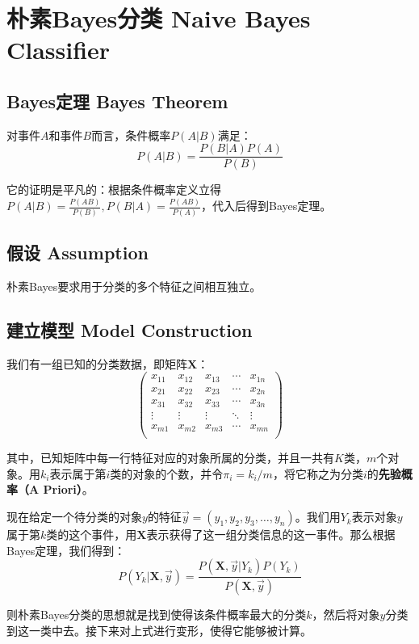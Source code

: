 \documentclass{MGLSA-cn-book-math}
\begin{document}
\section{朴素Bayes分类 Naive Bayes Classifier}
\subsection{Bayes定理 Bayes Theorem}
对事件$A$和事件$B$而言，条件概率$P(A|B)$满足：
\[
	P(A|B)=\frac{P(B|A)P(A)}{P(B)}
\]

它的证明是平凡的：根据条件概率定义立得$P(A|B)=\frac{P(AB)}{P(B)},P(B|A)=\frac{P(AB)}{P(A)}$，代入后得到Bayes定理。
\subsection{假设 Assumption}
朴素Bayes要求用于分类的多个特征之间相互独立。
\subsection{建立模型 Model Construction}
我们有一组已知的分类数据，即矩阵$\bm{X}$：
\[
	\begin{pmatrix}
		x_{11} & x_{12} & x_{13} & \cdots & x_{1n} \\
		x_{21} & x_{22} & x_{23} & \cdots & x_{2n} \\
		x_{31} & x_{32} & x_{33} & \cdots & x_{3n} \\
		\vdots & \vdots & \vdots & \ddots & \vdots \\
		x_{m1} & x_{m2} & x_{m3} & \cdots & x_{mn} \\
	\end{pmatrix}
\]

其中，已知矩阵中每一行特征对应的对象所属的分类，并且一共有$K$类，$m$个对象。用$k_i$表示属于第$i$类的对象的个数，并令$\pi_i=k_i/m$，将它称之为分类$i$的\textbf{先验概率（A Priori）}。

现在给定一个待分类的对象$y$的特征$\vec{y}=(y_1,y_2,y_3,\dots,y_n)$。我们用$Y_k$表示对象$y$属于第$k$类的这个事件，用$\bm{X}$表示获得了这一组分类信息的这一事件。那么根据Bayes定理，我们得到：
\[
	P(Y_k|\bm{X}, \vec{y})=\frac{P(\bm{X}, \vec{y}|Y_k)P(Y_k)}{P(\bm{X}, \vec{y})}
\]

则朴素Bayes分类的思想就是找到使得该条件概率最大的分类$k$，然后将对象$y$分类到这一类中去。接下来对上式进行变形，使得它能够被计算。

\end{document}
